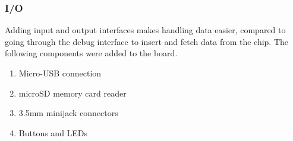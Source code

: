 \subsubsection{I/O}

Adding input and output interfaces makes handling data easier, compared to going
through the debug interface to insert and fetch data from the chip. The
following components were added to the board.

\begin{enumerate}
	\item Micro-USB connection
	\item microSD memory card reader
	\item 3.5mm minijack connectors
	\item Buttons and LEDs
\end{enumerate}
